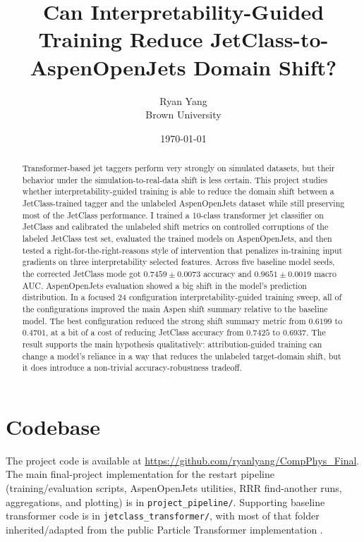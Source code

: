 \documentclass[11pt]{article}
\title{Can Interpretability-Guided Training Reduce JetClass-to-AspenOpenJets Domain Shift?}
\author{Ryan Yang\\Brown University}
\date{\today}
\begin{document}
\maketitle

\begin{abstract}

Transformer-based jet taggers perform very strongly on simulated datasets, but their behavior under the simulation-to-real-data shift is less certain. This project studies whether interpretability-guided training is able to reduce the domain shift between a JetClass-trained tagger and the unlabeled AspenOpenJets dataset while still preserving most of the JetClass performance. I trained a 10-class transformer jet classifier on JetClass and calibrated the unlabeled shift metrics on controlled corruptions of the labeled JetClass test set, evaluated the trained models on AspenOpenJets, and then tested a right-for-the-right-reasons style of intervention that penalizes in-training input gradients on three interpretability selected features. Across five baseline model seeds, the corrected JetClass mode got $0.7459\pm0.0073$ accuracy and  $0.9651\pm0.0019$ macro AUC. AspenOpenJets evaluation showed a big shift in the model’s prediction distribution. In a focused 24 configuration interpretability-guided training sweep, all of the configurations improved the main Aspen shift summary relative to the baseline model. The best configuration reduced the strong shift summary metric from  $0.6199$ to $0.4701$, at a bit of a cost of reducing JetClass accuracy from  $0.7425$ to $0.6937$. The result supports the main hypothesis qualitatively: attribution-guided training can change a model’s reliance in a way that reduces the unlabeled target-domain shift, but it does introduce a non-trivial accuracy-robustness tradeoff.

\end{abstract}

\section*{Codebase}
The project code is available at \url{https://github.com/ryanlyang/CompPhys_Final}. The main final-project implementation for the restart pipeline (training/evaluation scripts, AspenOpenJets utilities, RRR find-another runs, aggregations, and plotting) is in \texttt{project\_pipeline/}. Supporting baseline transformer code is in \texttt{jetclass\_transformer/}, with most of that folder inherited/adapted from the public Particle Transformer implementation \cite{qu2022particle}.
\end{document}
